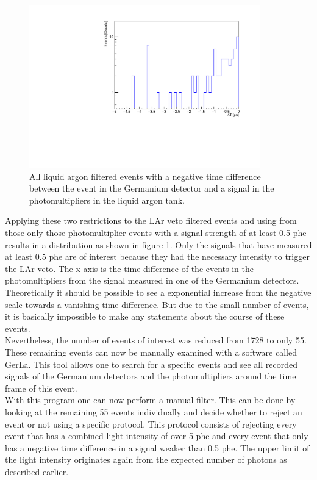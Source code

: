 \documentclass[encoding=utf8,british]{tumphthesis}
\begin{document}
\begin{figure}[t!]
	\centering
	\ifmakefigures%
	\includegraphics[width=100mm]{./Bilder/TriggerTimeOnly4.pdf}
	\fi%

	\caption{
		All liquid argon filtered events with a negative time difference between the event in the Germanium detector and a signal in the photomultipliers in the liquid argon tank.
	}
    	\label{fig:Trigger4}
\end{figure}
Applying these two restrictions to the LAr veto filtered events and using from those only those photomultiplier events with a signal strength of at least 0.5 phe results in a distribution as shown in figure \ref{fig:Trigger4}.
Only the signals that have measured at least 0.5 phe are of interest because they had the necessary intensity to trigger the LAr veto. 
The x axis is the time difference of the events in the photomultipliers from the signal measured in one of the Germanium detectors.
Theoretically it should be possible to see a exponential increase from the negative scale towards a vanishing time difference.
But due to the small number of events, it is basically impossible to make any statements about the course of these events.
\\

Nevertheless, the number of events of interest was reduced from 1728 to only 55.  
These remaining events can now be manually examined with a software called GerLa.
This tool allows one to search for a specific events and see all recorded signals of the Germanium detectors and the photomultipliers around the time frame of this event.
\\

With this program one can now perform a manual filter.
This can be done by looking at the remaining 55 events individually and decide whether to reject an event or not using a specific protocol.
This protocol consists of rejecting every event that has a combined light intensity of over 5 phe and every event that only has a negative time difference in a signal weaker than 0.5 phe.
The upper limit of the light intensity originates again from the expected number of photons as described earlier.
\\
\end{document}
